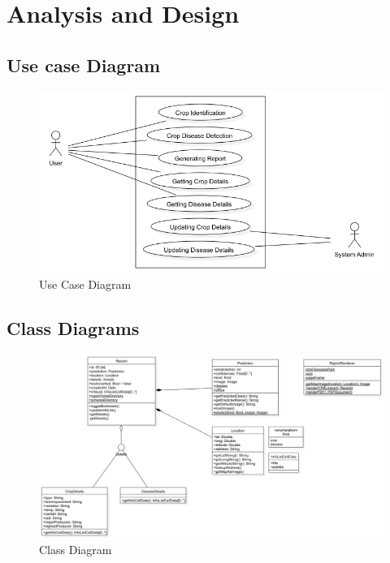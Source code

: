 \documentclass[../Report.tex]{subfiles}
\begin{document}
\chapter{Analysis and Design}

\section{Use case Diagram}
\begin{figure}[H]
    \centering
    \includegraphics[width=0.8\linewidth]{images/usecase_2.png}
    \caption{Use Case Diagram}
    \label{fig:usecase}
\end{figure}

\section{Class Diagrams}
\begin{figure}[H]
    \centering
    \includegraphics[width=0.8\linewidth]{images/class.png}
    \caption{Class Diagram}
    \label{fig:class}
\end{figure}
\end{document}
